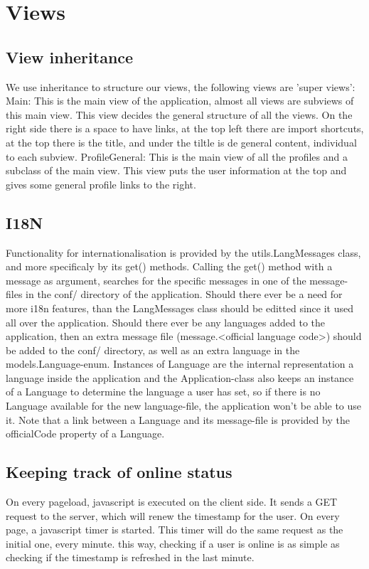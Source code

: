 \documentclass[11pt,a4paper]{article}
\begin{document}
\section{Views}
\subsection{View inheritance}
We use inheritance to structure our views, the following views are  'super views':
Main: This is the main view of the application, almost all views are subviews of this main view. This view decides the general structure of all the views. On the right side there is a space to have links, at the top left there are import shortcuts, at the top there is the title, and under the tiltle is de general content, individual to each subview.
ProfileGeneral: This is the main  view of all the profiles and a subclass of the main view. This view puts the user information at the top and gives some general profile links to the right.

\subsection{I18N}
Functionality for internationalisation is provided by the utils.LangMessages class, and more specificaly by its get() methods. Calling the get() method with a message as argument, searches for the specific messages in one of the message-files in the conf/ directory of the application.
Should there ever be a need for more i18n features, than the LangMessages class should be editted since it used all over the application.
Should there ever be any languages added to the application, then an extra message file (message.<official language code>) should be added to the conf/ directory, as well as an extra language in the models.Language-enum. Instances of Language are the internal representation a language inside the application and the Application-class also keeps an instance of a Language to determine the language a user has set, so if there is no Language available for the new language-file, the application won't be able to use it. Note that a link between a Language and its message-file is provided by the officialCode property of a Language.

\subsection{Keeping track of online status}
On every pageload, javascript is executed on the client side. It sends a GET request to the server, which will renew the timestamp for the user. On every page, a javascript timer is started. This timer will do the same request as the initial one, every minute. this way, checking if a user is online is as simple as checking if the timestamp is refreshed in the last minute.
\end{document}
